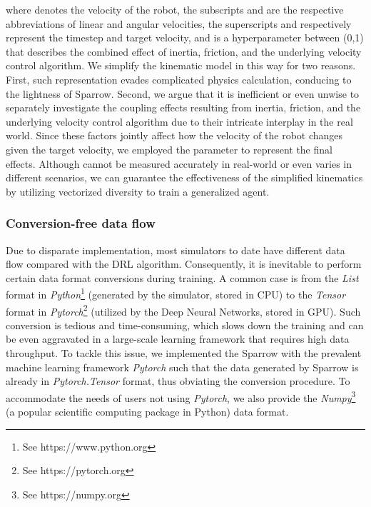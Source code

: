 \documentclass[journal]{IEEEtran}
\begin{document}
\noindent where  denotes the velocity of the robot, the subscripts  and  are the respective abbreviations of linear and angular velocities, the superscripts  and  respectively represent the timestep and target velocity, and  is a hyperparameter between (0,1) that describes the combined effect of inertia, friction, and the underlying velocity control algorithm. We simplify the kinematic model in this way for two reasons. First, such representation evades complicated physics calculation, conducing to the lightness of Sparrow. Second, we argue that it is inefficient or even unwise to separately investigate the coupling effects resulting from inertia, friction, and the underlying velocity control algorithm due to their intricate interplay in the real world. Since these factors jointly affect how the velocity of the robot changes given the target velocity, we employed the parameter  to represent the final effects. Although  cannot be measured accurately in real-world or even varies in different scenarios, we can guarantee the effectiveness of the simplified kinematics by utilizing vectorized diversity to train a generalized agent.

\subsubsection{Conversion-free data flow}
Due to disparate implementation, most simulators to date have different data flow compared with the DRL algorithm. Consequently, it is inevitable to perform certain data format conversions during training. A common case is from the \textit{List} format in \textit{Python}\footnote{See https://www.python.org} (generated by the simulator, stored in CPU) to the \textit{Tensor} format in \textit{Pytorch}\footnote{See https://pytorch.org} (utilized by the Deep Neural Networks, stored in GPU). Such conversion is tedious and time-consuming, which slows down the training and can be even aggravated in a large-scale learning framework that requires high data throughput. To tackle this issue, we implemented the Sparrow with the prevalent machine learning framework \textit{Pytorch} such that the data generated by Sparrow is already in \textit{Pytorch.Tensor} format, thus obviating the conversion procedure. To accommodate the needs of users not using \textit{Pytorch}, we also provide the \textit{Numpy}\footnote{See https://numpy.org} (a popular scientific computing package in Python) data format.
\end{document}
